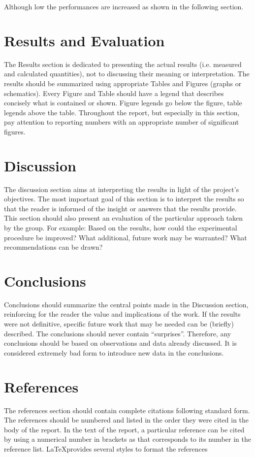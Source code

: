 Although low the performances are increased as shown in the following section.

\section{Results and Evaluation}
The Results section is dedicated to presenting the actual results (i.e. measured and calculated quantities), not to discussing their meaning or interpretation. The results should be summarized using appropriate Tables and Figures (graphs or schematics). Every Figure and Table should have a legend that describes concisely what is contained or shown. Figure legends go below the figure, table legends above the table. Throughout the report, but especially in this section, pay attention to reporting numbers with an appropriate number of significant figures. 

\section{Discussion}
The discussion section aims at interpreting the results in light of the project's objectives. The most important goal of this section is to interpret the results so that the reader is informed of the insight or answers that the results provide. This section should also present an evaluation of the particular approach taken by the group. For example: Based on the results, how could the experimental procedure be improved? What additional, future work may be warranted? What recommendations can be drawn?


\section{Conclusions}
Conclusions should summarize the central points made in the Discussion section, reinforcing for the reader the value and implications of the work. If the results were not definitive, specific future work that may be needed can be (briefly) described. The conclusions should never contain ``surprises''. Therefore, any conclusions should be based on observations and data already discussed. It is considered extremely bad form to introduce new data in the conclusions.

\section*{References}

The references section should contain complete citations following standard form.  The references should be numbered and listed in the order they were cited in the body of the report. In the text of the report, a particular reference can be cited by using a numerical number in brackets as \cite{Lee2015} that corresponds to its number in the reference list. \LaTeX provides several styles to format the references




